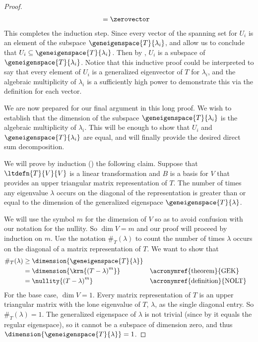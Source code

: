\begin{proof}
\begin{align*}
%
&=\zerovector
%
\end{align*}
%
This completes the induction step.  Since every vector of the spanning set for $U_i$ is an element of the subspace $\geneigenspace{T}{\lambda_i}$,  and  allow us to conclude that $U_i\subseteq\geneigenspace{T}{\lambda_i}$.  Then by , $U_i$ is a subspace of $\geneigenspace{T}{\lambda_i}$.  Notice that this inductive proof could be interpreted to say that every element of $U_i$ is a generalized eigenvector of $T$ for $\lambda_i$, and the algebraic multiplicity of $\lambda_i$ is a sufficiently high power to demonstrate this via the definition for each vector.\par
%
We are now prepared for our final argument in this long proof.  We wish to establish that the dimension of the subspace $\geneigenspace{T}{\lambda_i}$ is the algebraic multiplicity of $\lambda_i$.  This will be enough to show that $U_i$ and $\geneigenspace{T}{\lambda_i}$ are equal, and will finally provide the desired direct sum decomposition.\par
%
We will prove by induction () the following claim.  Suppose that $\ltdefn{T}{V}{V}$ is a linear transformation and $B$ is a basis for $V$ that provides an upper triangular matrix representation of $T$.  The number of times any eigenvalue $\lambda$ occurs on the diagonal of the representation is greater than or equal to the dimension of the generalized eigenspace  $\geneigenspace{T}{\lambda}$.\par
%
We will use the symbol $m$ for the dimension of $V$ so as to avoid confusion with our notation for the nullity.  So $\dim{V}=m$ and our proof will proceed by induction on $m$.  Use the notation $\#_T(\lambda)$ to count the number of times $\lambda$ occurs on the diagonal of a matrix representation of $T$.  We want to show that
%
\begin{align*}
\#_T(\lambda)&\geq\dimension{\geneigenspace{T}{\lambda}}\\
&=\dimension{\krn{\left(T-\lambda\right)^m}}&&\text{\acronymref{theorem}{GEK}}\\
&=\nullity{\left(T-\lambda\right)^m}&&\text{\acronymref{definition}{NOLT}}\\
\end{align*}
%
For the base case, $\dim{V}=1$.  Every matrix representation of $T$ is an upper triangular matrix with the lone eigenvalue of $T$, $\lambda$, as the single diagonal entry.  So $\#_T(\lambda)=1$.  The generalized eigenspace of $\lambda$ is not trivial (since by  it equals the regular eigenspace), so it cannot be a subspace of dimension zero, and thus $\dimension{\geneigenspace{T}{\lambda}}=1$.\par

\end{proof}
